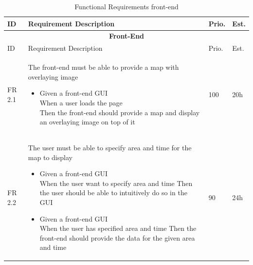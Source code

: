 \documentclass[11pt,a4paper,titlepage,oneside]{report}
\begin{document}
  \begin{longtable}{p{1.4cm} p{7.8cm} p{1cm} p{1cm} }
  \caption[]{Functional Requirements \gls{front-end}} \\
  \hline \hline
  \multicolumn{1}{p{1.4cm}}{ID} &
  \multicolumn{1}{p{7.8cm}}{Requirement Description} &
  \multicolumn{1}{p{1cm}}{Prio.} &
  \multicolumn{1}{p{1cm}}{Est.}
  \endhead

  \caption[Functional Requirements \gls{front-end}]{} \label{funcReqsFront} \\
  \hline \multicolumn{4}{c}{\textbf{Front-End}} \\
  \multicolumn{1}{p{1.4cm}}{ID} &
  \multicolumn{1}{p{7.8cm}}{Requirement Description} &
  \multicolumn{1}{p{1cm}}{Prio.} &
  \multicolumn{1}{p{1cm}}{Est.}
  \endfirsthead

  \hline
  \multicolumn{4}{r}{{Continued on next page}} \\
  \endfoot

  \hline \hline
  \endlastfoot
  
  \hline
  FR 2.1 & The \gls{front-end} must be able to provide a map with overlaying image
  \begin{itemize}
  \item \parbox[t]{6.8cm}{
        Given a \gls{front-end} \gls{GUI} \\
        When a user loads the page \\
        Then the \gls{front-end} should provide a map and display an overlaying image on top of it}
  \end{itemize}
  & 100 & 20h \\ \hline

  FR 2.2 & The user must be able to specify area and time for the map to display
  \begin{itemize}
  \item \parbox[t]{6.8cm}{
        Given a \gls{front-end} \gls{GUI} \\
        When the user want to specify area and time
        Then the user should be able to intuitively do so in the \gls{GUI}}
  \item \parbox[t]{6.8cm}{
        Given a \gls{front-end} \gls{GUI} \\
        When the user has specified area and time
        Then the \gls{front-end} should provide the data for the given area and time}
  \end{itemize}
  & 90 & 24h \\ \hline


\end{longtable}
\end{document}
